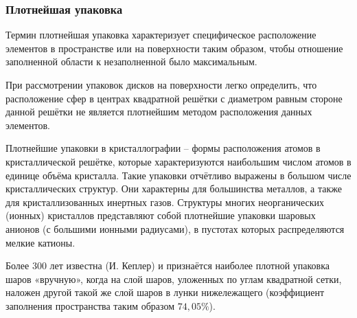 \subsubsection{\label{subsubsect:tight_packing}Плотнейшая упаковка}

Термин плотнейшая упаковка характеризует специфическое расположение элементов в пространстве или на поверхности таким образом, чтобы отношение заполненной области к незаполненной было максимальным. 

При рассмотрении упаковок дисков на поверхности легко определить, что расположение сфер в центрах квадратной решётки с диаметром равным стороне данной решётки не является плотнейшим методом расположения данных элементов.

Плотнейшие упаковки в кристаллографии -- формы расположения атомов в кристаллической решётке, которые характеризуются наибольшим числом атомов в единице объёма кристалла. Такие упаковки отчётливо выражены в большом числе кристаллических структур. Они характерны для большинства металлов, а также для кристаллизованных инертных газов. Структуры многих неорганических (ионных) кристаллов представляют собой плотнейшие упаковки шаровых анионов (с большими ионными радиусами), в пустотах которых распределяются мелкие катионы.

Более 300 лет известна (И. Кеплер) и признаётся наиболее плотной упаковка шаров «вручную», когда на слой шаров, уложенных по углам квадратной сетки, наложен другой такой же слой шаров в лунки нижележащего (коэффициент заполнения пространства таким образом $74,05\%$).

